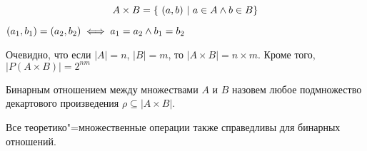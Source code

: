 \begin{equation*}
    A \times B = \{ ~(a, b) ~|~ a \in A \wedge b \in B\}
\end{equation*}

$(a_1, b_1) = (a_2, b_2) \iff a_1 = a_2 \wedge b_1 = b_2$

Очевидно, что если $|A| = n$, $|B| = m$, то $|A\times B| = n \times m$. Кроме того, $|P(A\times B)| = 2^{nm}$

Бинарным отношением между множествами $A$ и $B$ назовем любое подмножество
декартового произведения $\rho \subseteq |A \times B|$.

Все теоретико"=множественные операции также справедливы для бинарных отношений.








    
